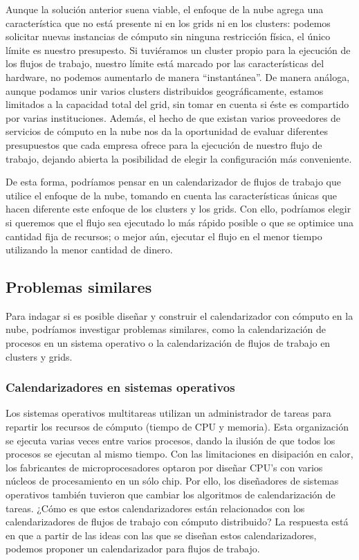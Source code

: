 \documentclass[letterpaper, 12pt]{report}
\begin{document}
Aunque la solución anterior suena viable, el enfoque de la nube agrega una característica que no está presente ni en los grids ni en los clusters: podemos solicitar nuevas instancias de cómputo sin ninguna restricción física, el único límite es nuestro presupesto. Si tuviéramos un cluster propio para la ejecución de los flujos de trabajo, nuestro límite está marcado por las características del hardware, no podemos aumentarlo de manera ``instantánea''. De manera análoga, aunque podamos unir varios clusters distribuidos geográficamente, estamos limitados a la capacidad total del grid, sin tomar en cuenta si éste es compartido por varias instituciones. Además, el hecho de que existan varios proveedores de servicios de cómputo en la nube nos da la oportunidad de evaluar diferentes presupuestos que cada empresa ofrece para la ejecución de nuestro flujo de trabajo, dejando abierta la posibilidad de elegir la configuración más conveniente.

De esta forma, podríamos pensar en un calendarizador de flujos de trabajo que utilice el enfoque de la nube, tomando en cuenta las características únicas que hacen diferente este enfoque de los clusters y los grids. Con ello, podríamos elegir si queremos que el flujo sea ejecutado lo más rápido posible o que se optimice una cantidad fija de recursos; o mejor aún, ejecutar el flujo en el menor tiempo utilizando la menor cantidad de dinero.


\subsection*{Problemas similares}

Para indagar si es posible diseñar y construir el calendarizador con cómputo en la nube, podríamos investigar problemas similares, como la calendarización de procesos en un sistema operativo o la calendarización de flujos de trabajo en clusters y grids.

\subsubsection*{Calendarizadores en sistemas operativos}

Los sistemas operativos multitareas utilizan un administrador de tareas para repartir los recursos de cómputo (tiempo de CPU y memoria). Esta organización se ejecuta varias veces entre varios procesos, dando la ilusión de que todos los procesos se ejecutan al mismo tiempo. Con las limitaciones en disipación en calor, los fabricantes de microprocesadores optaron por diseñar CPU's con varios núcleos de procesamiento en un sólo chip. Por ello, los diseñadores de sistemas operativos también tuvieron que cambiar los algoritmos de calendarización de tareas. ¿Cómo es que estos calendarizadores están relacionados con los calendarizadores de flujos de trabajo con cómputo distribuido? La respuesta está en que a partir de las ideas con las que se diseñan estos calendarizadores, podemos proponer un calendarizador para flujos de trabajo.
\end{document}
